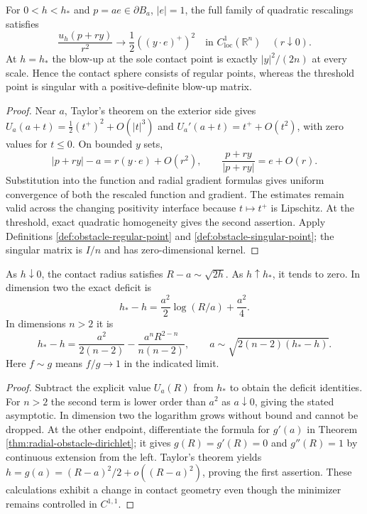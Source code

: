 \begin{proposition}\label{prop:radial-obstacle-blowups}
For $0<h<h_*$ and $p=ae\in\partial B_a$, $|e|=1$, the full family of quadratic rescalings satisfies
\[
 \frac{u_h(p+ry)}{r^2}\longrightarrow\frac12((y\cdot e)^+)^2
 \quad\text{in }C^1_{\mathrm{loc}}(\mathbb R^n)\quad(r\downarrow0).
\]
At $h=h_*$ the blow-up at the sole contact point is exactly $|y|^2/(2n)$ at every scale. Hence the contact sphere consists of regular points, whereas the threshold point is singular with a positive-definite blow-up matrix.
\end{proposition}
\begin{proof}
Near $a$, Taylor's theorem on the exterior side gives $U_a(a+t)=\frac12(t^+)^2+O(|t|^3)$ and $U_a'(a+t)=t^++O(t^2)$, with zero values for $t\leq0$. On bounded $y$ sets,
\[
 |p+ry|-a=r(y\cdot e)+O(r^2),\qquad
 \frac{p+ry}{|p+ry|}=e+O(r).
\]
Substitution into the function and radial gradient formulas gives uniform convergence of both the rescaled function and gradient. The estimates remain valid across the changing positivity interface because $t\mapsto t^+$ is Lipschitz. At the threshold, exact quadratic homogeneity gives the second assertion. Apply Definitions \ref{def:obstacle-regular-point} and \ref{def:obstacle-singular-point}; the singular matrix is $I/n$ and has zero-dimensional kernel.
\end{proof}

\begin{proposition}\label{prop:radial-obstacle-contact-asymptotics}
As $h\downarrow0$, the contact radius satisfies $R-a\sim\sqrt{2h}$. As $h\uparrow h_*$, it tends to zero. In dimension two the exact deficit is
\[
 h_*-h=\frac{a^2}{2}\log(R/a)+\frac{a^2}{4}.
\]
In dimensions $n>2$ it is
\[
 h_*-h=\frac{a^2}{2(n-2)}-\frac{a^nR^{2-n}}{n(n-2)},
 \qquad a\sim\sqrt{2(n-2)(h_*-h)}.
\]
Here $f\sim g$ means $f/g\to1$ in the indicated limit.
\end{proposition}
\begin{proof}
Subtract the explicit value $U_a(R)$ from $h_*$ to obtain the deficit identities. For $n>2$ the second term is lower order than $a^2$ as $a\downarrow0$, giving the stated asymptotic. In dimension two the logarithm grows without bound and cannot be dropped. At the other endpoint, differentiate the formula for $g'(a)$ in Theorem \ref{thm:radial-obstacle-dirichlet}; it gives $g(R)=g'(R)=0$ and $g''(R)=1$ by continuous extension from the left. Taylor's theorem yields $h=g(a)=(R-a)^2/2+o((R-a)^2)$, proving the first assertion. These calculations exhibit a change in contact geometry even though the minimizer remains controlled in $C^{1,1}$.
\end{proof}


